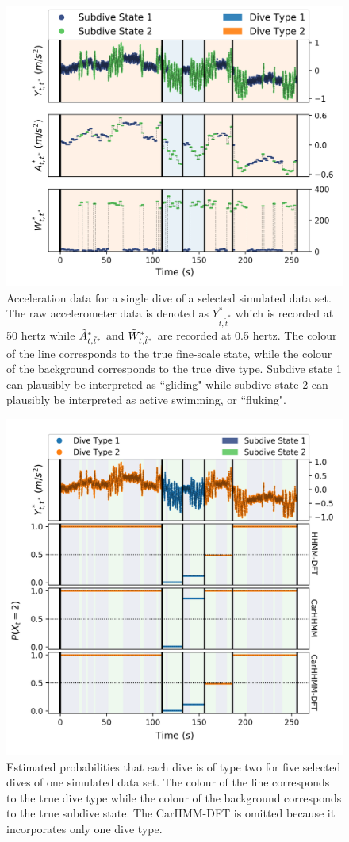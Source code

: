 \begin{figure}[ht]
	\centering
	\includegraphics[width=5in]{../Plots/sim_data.png}
	\caption{Acceleration data for a single dive of a selected simulated data set. The raw accelerometer data is denoted as $Y^*_{t,\tilde t^*}$ which is recorded at 50 hertz while $\tilde{A}^*_{t,\tilde t^*}$ and $\tilde{W}^*_{t,\tilde t^*}$ are recorded at 0.5 hertz. The colour of the line corresponds to the true fine-scale state, while the colour of the background corresponds to the true dive type. Subdive state 1 can plausibly be interpreted as ``gliding" while subdive state 2 can plausibly be interpreted as active swimming, or ``fluking".}
	\label{fig:sim_data}
\end{figure}

\begin{figure}[ht]
    \centering
    \includegraphics[width=4.5in]{../Plots/Posterior_Coarse_States.png}
    \caption{Estimated probabilities that each dive is of type two for five selected dives of one simulated data set. The colour of the line corresponds to the true dive type while the colour of the background corresponds to the true subdive state. The CarHMM-DFT is omitted because it incorporates only one dive type.}
    \label{fig:acc_coarse}
\end{figure}

